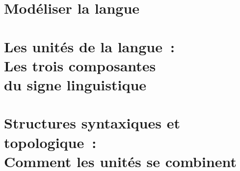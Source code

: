 \documentclass
  [output=book,
   booklanguage=french, 
   multiauthors,
   colorlinks,
   citecolor=brown,
   drafmode,
  ]{langscibook}
\begin{document}
\maketitle
\frontmatter
\tableofcontents
\newpage{}
\mainmatter




\part{Modéliser la langue}





\part{Les unités de la langue~:\\Les trois composantes\\du signe linguistique}\label{sec:2}





\part{Structures syntaxiques et topologique~:\\Comment les unités se combinent}\label{sec:3}









% 

\end{document}

